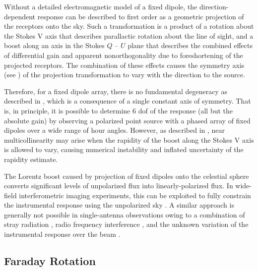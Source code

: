 Without a detailed electromagnetic model of a fixed dipole, the direction-dependent response
can be described to first order as a geometric projection of the receptors onto the sky.
%
Such a transformation is a product of 
    a rotation about the Stokes V axis that describes parallactic rotation about the line of sight, and 
    a boost along an axis in the Stokes $Q$ -- $U$ plane that describes the combined effects of differential gain and apparent nonorthogonality due to foreshortening of the projected receptors.
%
The combination of these effects causes the symmetry axis (see ) of the projection transformation to vary with the direction to the source.

Therefore, for a fixed dipole array,
there is no fundamental degeneracy as described in , which is a consequence of a single constant axis of symmetry.
%
That is, in principle, it is possible to determine 6 dof of the response (all but the absolute gain) by observing a polarized point source with a phased array of fixed dipoles over a wide range of hour angles.
%
However, as described in , near multicollinearity may arise when the rapidity of the boost along the Stokes V axis is allowed to vary, causing numerical instability and inflated uncertainty of the rapidity estimate.
%

The Lorentz boost caused by projection of fixed dipoles onto the celestial sphere converts significant levels of unpolarized flux into linearly-polarized flux.  
%
In wide-field interferometric imaging experiments, this can be exploited to fully constrain the instrumental response using the unpolarized sky \citep[e.g.,][]{bmh+22,kvd+25}.
%
A similar approach is generally not possible in single-antenna observations owing to a combination of stray radiation \citep[e.g.][]{2002ASPC..278..397L}, radio frequency interference \citep[e.g.][]{2010MNRAS.405..155O}, and the unknown variation of the instrumental response over the beam .


\subsection{Faraday Rotation}
\label{sec:Faraday}

